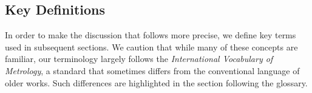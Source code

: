 \subsection{Key Definitions}

In order to make the discussion that follows more precise, we define key terms used in subsequent sections.  We caution that while many of these concepts are familiar, our terminology largely follows the {\it International Vocabulary of Metrology}, a standard that sometimes differs from the conventional language of older works. \cite{JCGM:GUM2008,JCGM:VIM2012}  Such differences are highlighted in the section following the glossary.



